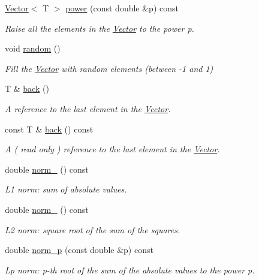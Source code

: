 \begin{DoxyCompactItemize}
\hyperlink{classLuna_1_1Vector}{Vector}$<$ T $>$ \hyperlink{classLuna_1_1Vector_ad691f671733f78bbf3bdbaf46fcbc5a0}{power} (const double \&p) const
\begin{DoxyCompactList}\small\item\em Raise all the elements in the \hyperlink{classLuna_1_1Vector}{Vector} to the power p. \end{DoxyCompactList}\item 
void \hyperlink{classLuna_1_1Vector_af5d145bb808403eca4a2ea4edd1132c2}{random} ()
\begin{DoxyCompactList}\small\item\em Fill the \hyperlink{classLuna_1_1Vector}{Vector} with random elements (between -\/1 and 1) \end{DoxyCompactList}\item 
T \& \hyperlink{classLuna_1_1Vector_add6be56568d90c49e5f616e334275786}{back} ()
\begin{DoxyCompactList}\small\item\em A reference to the last element in the \hyperlink{classLuna_1_1Vector}{Vector}. \end{DoxyCompactList}\item 
const T \& \hyperlink{classLuna_1_1Vector_a33f7acdc6965592629b2bb375c99cdc4}{back} () const
\begin{DoxyCompactList}\small\item\em A ( read only ) reference to the last element in the \hyperlink{classLuna_1_1Vector}{Vector}. \end{DoxyCompactList}\item 
double \hyperlink{classLuna_1_1Vector_a7f36db8f617c64ebe772e2af28c3e475}{norm\+\_} () const
\begin{DoxyCompactList}\small\item\em L1 norm\+: sum of absolute values. \end{DoxyCompactList}\item 
double \hyperlink{classLuna_1_1Vector_a1b06ed062a50b1006f991ffad6b9b8f4}{norm\+\_} () const
\begin{DoxyCompactList}\small\item\em L2 norm\+: square root of the sum of the squares. \end{DoxyCompactList}\item 
double \hyperlink{classLuna_1_1Vector_a3cc614bd51c84050cffc07f61b5238b2}{norm\+\_\+p} (const double \&p) const
\begin{DoxyCompactList}\small\item\em Lp norm\+: p-\/th root of the sum of the absolute values to the power p. \end{DoxyCompactList}\item 

\end{DoxyCompactItemize}
